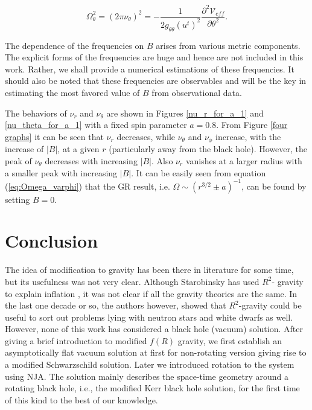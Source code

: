 \documentclass[12pt,a4paper,oneside]{book}
\newcommand{\eq}[2]{\begin{equation} \label{eq:#1} #2 \end{equation}}
\newcommand{\Eref}[1]{(\ref{eq:#1})}
\begin{document}
\eq{nu_theta}{\Omega_\theta^2=\left(2\pi\nu_\theta\right)^2 =- \frac{1}{2g_{\theta\theta}(u^t)^2}\frac{\partial^2\mathcal{V}_{eff}}{\partial \theta^2}.}

The dependence of the frequencies on $B$ arises from various metric components. The explicit forms of the frequencies 
are huge and hence are not included in this work. Rather, we shall provide a numerical estimations of these frequencies. It should also be noted that these frequencies are observables and will be the key in estimating the most favored value of $B$ from observational data. 




The behaviors of $\nu_r$ and $\nu_\theta$ are shown in Figures \ref{nu_r_for_a_1} and \ref{nu_theta_for_a_1} with a fixed spin parameter $a = 0.8$. From Figure \ref{four graphs} it can be seen that $\nu_r$ decreases, while $\nu_\theta$ 
and $\nu_\phi$ increase, with the increase of $|B|$, at a given $r$ 
(particularly away from the black hole). However, the peak of $\nu_\theta$ 
decreases with increasing $|B|$. Also $\nu_r$ vanishes at a larger radius with
a smaller peak with increasing $|B|$. It can be easily seen from equation \Eref{Omega_varphi} that the GR result, i.e. $\Omega \sim (r^{3/2}\pm a)^{-1}$, can be found by setting $B=0$.



\chapter{Conclusion}
The idea of modification to gravity has been there in literature for some time, but its usefulness was not very clear. Although Starobinsky has used $R^2$- gravity to explain inflation \cite{1980PhLB...91...99S}, it was not clear if all the gravity theories are the same. In the last one decade or so, the authors
however, showed that $R^2$-gravity could be useful to sort out problems lying with
neutron stars and white dwarfs \cite{PhysRevD.82.064033,Arapo_lu_2011,
Upasana15,Kalita18} as well. However, none of this work has considered a black hole (vacuum) solution. After giving a brief introduction to modified $f(R)$ gravity, we first establish an asymptotically flat vacuum solution at first for non-rotating version giving rise to a modified Schwarzschild solution. Later we introduced rotation to the system using NJA. The solution mainly describes the space-time geometry around a rotating black hole, i.e., the modified Kerr black hole solution, for the first time of this kind to the best of our knowledge.
\end{document}
